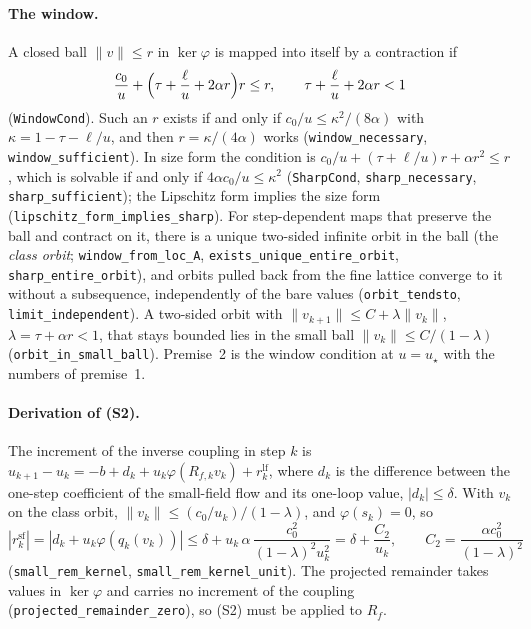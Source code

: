 \documentclass[11pt,a4paper]{article}
\theoremstyle{definition}
\theoremstyle{remark}
\newcommand{\lt}[1]{\texttt{#1}}
\begin{document}
\paragraph{The window.} A closed ball $\|v\|\le r$ in $\ker\varphi$ is mapped into itself by a contraction if
\[
\frac{c_0}{u}+\Bigl(\tau+\frac{\ell}u+2\alpha r\Bigr)r\le r,\qquad \tau+\frac{\ell}{u}+2\alpha r<1
\]
(\lt{WindowCond}). Such an $r$ exists if and only if $c_0/u\le\kappa^2/(8\alpha)$ with $\kappa=1-\tau-\ell/u$, and then $r=\kappa/(4\alpha)$ works (\lt{window\_\allowbreak{}necessary}, \lt{window\_\allowbreak{}sufficient}). In size form the condition is $c_0/u+(\tau+\ell/u)r+\alpha r^2\le r$, which is solvable if and only if $4\alpha c_0/u\le\kappa^2$ (\lt{SharpCond}, \lt{sharp\_\allowbreak{}necessary}, \lt{sharp\_\allowbreak{}sufficient}); the Lipschitz form implies the size form (\lt{lipschitz\_\allowbreak{}form\_\allowbreak{}implies\_\allowbreak{}sharp}). For step-dependent maps that preserve the ball and contract on it, there is a unique two-sided infinite orbit in the ball (the \emph{class orbit}; \lt{window\_\allowbreak{}from\_\allowbreak{}loc\_\allowbreak{}A}, \lt{exists\_\allowbreak{}unique\_\allowbreak{}entire\_\allowbreak{}orbit}, \lt{sharp\_\allowbreak{}entire\_\allowbreak{}orbit}), and orbits pulled back from the fine lattice converge to it without a subsequence, independently of the bare values (\lt{orbit\_\allowbreak{}tendsto}, \lt{limit\_\allowbreak{}independent}). A two-sided orbit with $\|v_{k+1}\|\le C+\lambda\|v_k\|$, $\lambda=\tau+\alpha r<1$, that stays bounded lies in the small ball $\|v_k\|\le C/(1-\lambda)$ (\lt{orbit\_\allowbreak{}in\_\allowbreak{}small\_\allowbreak{}ball}). Premise~2 is the window condition at $u=u_\star$ with the numbers of premise~1.

\paragraph{Derivation of (S2).} The increment of the inverse coupling in step $k$ is $u_{k+1}-u_k=-b+d_k+u_k\varphi(R_{f,k}v_k)+r^{\mathrm{lf}}_k$, where $d_k$ is the difference between the one-step coefficient of the small-field flow and its one-loop value, $|d_k|\le\delta$. With $v_k$ on the class orbit, $\|v_k\|\le(c_0/u_k)/(1-\lambda)$, and $\varphi(s_k)=0$, so
\[
|r^{\mathrm{sf}}_k|=|d_k+u_k\varphi(q_k(v_k))|\le\delta+u_k\,\alpha\,\frac{c_0^2}{(1-\lambda)^2u_k^2}=\delta+\frac{C_2}{u_k},\qquad C_2=\frac{\alpha c_0^2}{(1-\lambda)^2}
\]
(\lt{small\_\allowbreak{}rem\_\allowbreak{}kernel}, \lt{small\_\allowbreak{}rem\_\allowbreak{}kernel\_\allowbreak{}unit}). The projected remainder takes values in $\ker\varphi$ and carries no increment of the coupling (\lt{projected\_\allowbreak{}remainder\_\allowbreak{}zero}), so (S2) must be applied to $R_f$.
\end{document}
